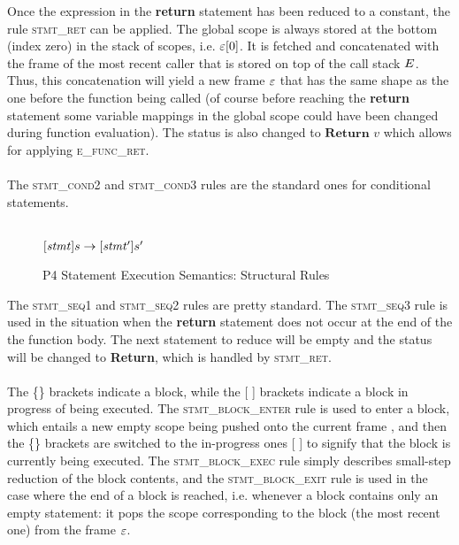 \documentclass[UTF8]{article}
\begin{document}
Once the expression in the \textbf{return} statement has been reduced to a constant, the rule \textsc{stmt\_ret} can be applied. The global scope \gscope{} is always stored at the bottom (index zero) in the stack of scopes, i.e. $\varepsilon [0]$. It is fetched and concatenated with the frame of the most recent caller that is stored on top of the call stack $E$. Thus, this concatenation will yield a new frame $\varepsilon$ that has the same shape as the one before the function being called (of course before reaching the \textbf{return} statement some variable mappings in the global scope \gscope{} could have been changed during function evaluation). The status is also changed to $\mathbf{Return} \,\, v$ which allows for applying \textsc{e\_func\_ret}.
\\~\\
The \textsc{stmt\_cond2} and \textsc{stmt\_cond3} rules are the standard ones for conditional statements.
\\~\\

\begin{figure}[ht!]
\begin{ottdefnblock}{$[  \mathit{stmt}  ]  s  \rightarrow  [  \mathit{stmt'}  ]  s'$}{}
\ottusedrule{\ottdrulestmtXXseqOne{}}
\ottusedrule{\ottdrulestmtXXseqTwo{}}
\ottusedrule{\ottdrulestmtXXseqThree{}}
\ottusedrule{\ottdrulestmtXXblockXXenter{}}
\ottusedrule{\ottdrulestmtXXblockXXexec{}}
\ottusedrule{\ottdrulestmtXXblockXXexit{}}
\end{ottdefnblock}
\caption{P4 Statement Execution Semantics: Structural Rules}
\label{fig:strsemstmtexec}
\end{figure}

The \textsc{stmt\_seq1} and \textsc{stmt\_seq2} rules are pretty standard. The \textsc{stmt\_seq3} rule is used in the situation when the \textbf{return} statement does not occur at the end of the the function body. The next statement to reduce will be empty and the status will be changed to \textbf{Return}, which is handled by \textsc{stmt\_ret}.
\\~\\
The \{\} brackets indicate a block, while the [ ] brackets indicate a block in progress of being executed.
The \textsc{stmt\_block\_enter} rule is used to enter a block, which entails a new empty scope \escope{} being pushed onto the current frame \currsf{}, and then the \{\} brackets are switched to the in-progress ones [ ] to signify that the block is currently being executed. The \textsc{stmt\_block\_exec} rule simply describes small-step reduction of the block contents, and the \textsc{stmt\_block\_exit} rule is used in the case where the end of a block is reached, i.e. whenever a block contains only an empty statement: it pops the scope corresponding to the block (the most recent one) from the frame $\varepsilon$.
\\~\\
\end{document}
